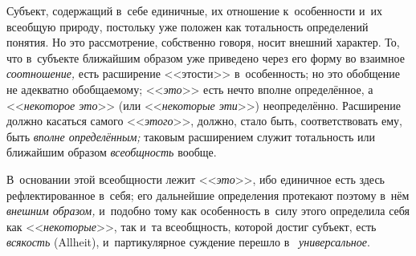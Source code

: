Субъект, содержащий в~себе единичные, их отношение к~особенности и~их всеобщую
природу, постольку уже положен как тотальность определений понятия. Но это
рассмотрение, собственно говоря, носит внешний характер. То, что в~субъекте
ближайшим образом уже приведено через его форму во взаимное {\em соотношение,}
есть расширение <<этости>> в~особенность; но это обобщение не адекватно
обобщаемому; <<{\em это}>> есть нечто вполне определённое, а <<{\em некоторое
это}>> (или <<{\em некоторые эти}>>) неопределённо. Расширение должно касаться
самого <<{\em этого}>>, должно, стало быть, соответствовать ему, быть
{\em вполне определённым;} таковым расширением служит тотальность или
ближайшим образом {\em всеобщность} вообще.

В~основании этой всеобщности лежит <<{\em это}>>, ибо единичное есть здесь
рефлектированное в~себя; его дальнейшие определения протекают поэтому в~нём
{\em внешним образом,} и~подобно тому как особенность в~силу этого определила
себя как <<{\em некоторые}>>, так и~та всеобщность, которой достиг субъект,
есть {\em всякость} (Allheit), и~партикулярное суждение перешло в~{\em
универсальное}.


